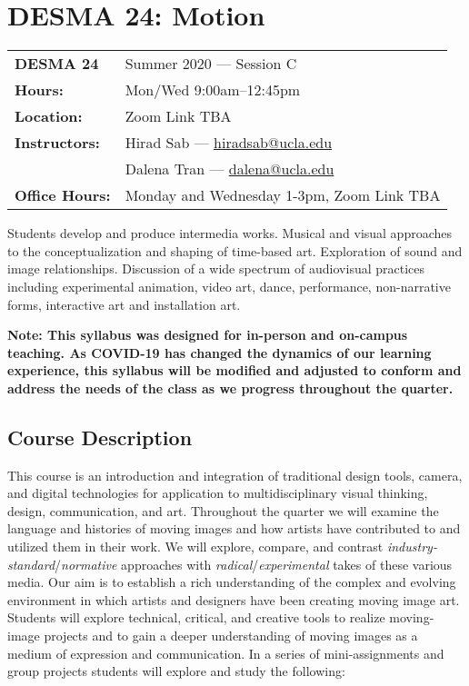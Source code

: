 \documentclass[10pt,letter,english]{article}
\begin{document}
\hypertarget{desma-24-motion}{%
      \section*{DESMA 24: Motion}\label{desma-24-motion}}

\begin{tabularx}{\textwidth}{@{}l X@{}}
      \textbf{DESMA 24}      & Summer 2020 --- Session C                                          \\
      \textbf{Hours:}        & Mon/Wed 9:00am--12:45pm                                            \\
      \textbf{Location:}     & Zoom Link TBA                                                      \\
      \textbf{Instructors:}  & Hirad Sab --- \href{mailto:hiradsab@ucla.edu}{{hiradsab@ucla.edu}} \\
                             & Dalena Tran --- \href{mailto:dalena@ucla.edu}{{dalena@ucla.edu}}   \\
      \textbf{Office Hours:} & Monday and Wednesday 1-3pm, Zoom Link TBA
\end{tabularx}

Students develop and produce intermedia works. Musical and visual approaches to the conceptualization and shaping of time-based art. Exploration of sound and image relationships. Discussion of a wide spectrum of audiovisual practices including experimental animation, video art, dance, performance, non-narrative forms, interactive art and installation art.

      {\small \tableofcontents}

\textbf{Note: This syllabus was designed for in-person and on-campus teaching. As COVID-19 has changed the dynamics of our learning experience, this syllabus will be modified and adjusted to conform and address the needs of the class as we progress throughout the quarter.}

\hypertarget{course-description}{%
      \subsection{Course Description}\label{course-description}}

This course is an introduction and integration of traditional design tools, camera, and digital technologies for application to multidisciplinary visual thinking, design, communication, and art. Throughout the quarter we will examine the language and histories of moving images and how artists have contributed to and utilized them in their work. We will explore, compare, and contrast \emph{industry-standard}/\emph{normative} approaches with \emph{radical}/\emph{experimental} takes of these various media. Our aim is to establish a rich understanding of the complex and evolving environment in which artists and designers have been creating moving image art. Students will explore technical, critical, and creative tools to realize moving-image projects and to gain a deeper understanding of moving images as a medium of expression and communication. In a series of mini-assignments and group projects students will explore and study the following:
\end{document}
